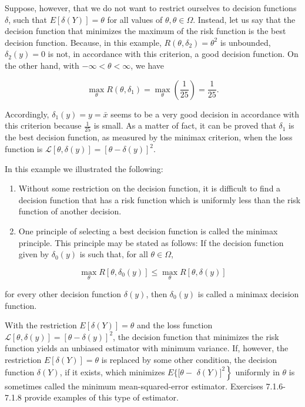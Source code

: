 Suppose, however, that we do not want to restrict ourselves to decision functions $\delta$, such that $E[\delta(Y)]=\theta$ for all values of $\theta, \theta \in \Omega$. Instead, let us say that the decision function that minimizes the maximum of the risk function is the best decision function. Because, in this example, $R\left(\theta, \delta_{2}\right)=\theta^{2}$ is unbounded, $\delta_{2}(y)=0$ is not, in accordance with this criterion, a good decision function. On the other hand, with $-\infty<\theta<\infty$, we have

$$
\max _{\theta} R\left(\theta, \delta_{1}\right)=\max _{\theta}\left(\frac{1}{25}\right)=\frac{1}{25} .
$$

Accordingly, $\delta_{1}(y)=y=\bar{x}$ seems to be a very good decision in accordance with this criterion because $\frac{1}{25}$ is small. As a matter of fact, it can be proved that $\delta_{1}$ is the best decision function, as measured by the minimax criterion, when the loss function is $\mathcal{L}[\theta, \delta(y)]=[\theta-\delta(y)]^{2}$.

In this example we illustrated the following:

\begin{enumerate}
  \item Without some restriction on the decision function, it is difficult to find a decision function that has a risk function which is uniformly less than the risk function of another decision.
  \item One principle of selecting a best decision function is called the minimax principle. This principle may be stated as follows: If the decision function given by $\delta_{0}(y)$ is such that, for all $\theta \in \Omega$,
\end{enumerate}

$$
\max _{\theta} R\left[\theta, \delta_{0}(y)\right] \leq \max _{\theta} R[\theta, \delta(y)]
$$

for every other decision function $\delta(y)$, then $\delta_{0}(y)$ is called a minimax decision function.

With the restriction $E[\delta(Y)]=\theta$ and the loss function $\mathcal{L}[\theta, \delta(y)]=[\theta-\delta(y)]^{2}$, the decision function that minimizes the risk function yields an unbiased estimator with minimum variance. If, however, the restriction $E[\delta(Y)]=\theta$ is replaced by some other condition, the decision function $\delta(Y)$, if it exists, which minimizes $E\{[\theta-$ $\left.\delta(Y)]^{2}\right\}$ uniformly in $\theta$ is sometimes called the minimum mean-squared-error estimator. Exercises 7.1.6-7.1.8 provide examples of this type of estimator.

